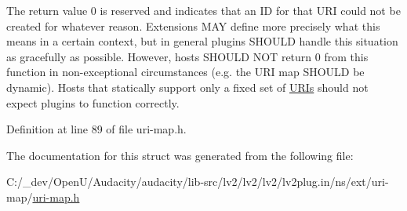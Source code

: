 The return value 0 is reserved and indicates that an ID for that U\+RI could not be created for whatever reason. Extensions M\+AY define more precisely what this means in a certain context, but in general plugins S\+H\+O\+U\+LD handle this situation as gracefully as possible. However, hosts S\+H\+O\+U\+LD N\+OT return 0 from this function in non-\/exceptional circumstances (e.\+g. the U\+RI map S\+H\+O\+U\+LD be dynamic). Hosts that statically support only a fixed set of \hyperlink{struct_u_r_is}{U\+R\+Is} should not expect plugins to function correctly. 

Definition at line 89 of file uri-\/map.\+h.



The documentation for this struct was generated from the following file\+:\begin{DoxyCompactItemize}
\item 
C\+:/\+\_\+dev/\+Open\+U/\+Audacity/audacity/lib-\/src/lv2/lv2/lv2/lv2plug.\+in/ns/ext/uri-\/map/\hyperlink{uri-map_8h}{uri-\/map.\+h}\end{DoxyCompactItemize}
